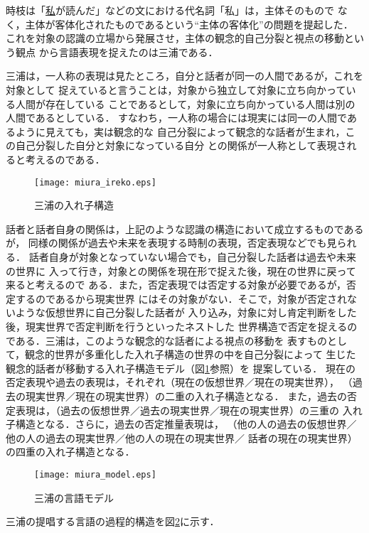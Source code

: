 \documentclass[japanese]{jnlp_1.2}
\begin{document}
時枝は「\underline{私}が読んだ」などの文における代名詞「私」は，主体そのもので
なく，主体が客体化されたものであるという``主体の客体化''の問題を提起した．
これを対象の認識の立場から発展させ，主体の観念的自己分裂と視点の移動という観点
から言語表現を捉えたのは三浦である．

三浦は，一人称の表現は見たところ，自分と話者が同一の人間であるが，これを対象として
捉えていると言うことは，対象から独立して対象に立ち向かっている人間が存在している
ことであるとして，対象に立ち向かっている人間は別の人間であるとしている．
すなわち，一人称の場合には現実には同一の人間であるように見えても，実は観念的な
自己分裂によって観念的な話者が生まれ，この自己分裂した自分と対象になっている自分
との関係が一人称として表現されると考えるのである．

\begin{figure}[b]
  \centering
      \texttt{[image: miura\_ireko.eps]}
  \caption{三浦の入れ子構造} \label{fig:miura_ireko}
\end{figure}

話者と話者自身の関係は，上記のような認識の構造において成立するものであるが，
同様の関係が過去や未来を表現する時制の表現，否定表現などでも見られる．
話者自身が対象となっていない場合でも，自己分裂した話者は過去や未来の世界に
入って行き，対象との関係を現在形で捉えた後，現在の世界に戻って来ると考えるので
ある．また，否定表現では否定する対象が必要であるが，否定するのであるから現実世界
にはその対象がない．そこで，対象が否定されないような仮想世界に自己分裂した話者が
入り込み，対象に対し肯定判断をした後，現実世界で否定判断を行うといったネストした
世界構造で否定を捉えるのである．三浦は，このような観念的な話者による視点の移動を
表すものとして，観念的世界が多重化した入れ子構造の世界の中を自己分裂によって
生じた観念的話者が移動する入れ子構造モデル（図\ref{fig:miura_ireko}参照）を
提案している．
現在の否定表現や過去の表現は，それぞれ（現在の仮想世界／現在の現実世界），
（過去の現実世界／現在の現実世界）の二重の入れ子構造となる．
また，過去の否定表現は，（過去の仮想世界／過去の現実世界／現在の現実世界）の三重の
入れ子構造となる．さらに，過去の否定推量表現は，
（他の人の過去の仮想世界／他の人の過去の現実世界／他の人の現在の現実世界／
話者の現在の現実世界）
の四重の入れ子構造となる．

\begin{figure}[t]
  \centering
      \texttt{[image: miura\_model.eps]}
  \caption{三浦の言語モデル} \label{fig:miura_model}
\end{figure}

三浦の提唱する言語の過程的構造を図\ref{fig:miura_model}に示す．
\end{document}
